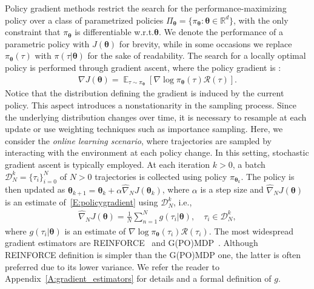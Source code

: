 \documentclass{article}
\makeatletter
\theoremstyle{remark}
\theoremstyle{definition}
\DeclareRobustCommand{\ie}{i.e.,\@\xspace}
\DeclareRobustCommand{\wrt}{w.r.t.\@\xspace}
\newcommand{\realspace}{\mathbb R}      %
\DeclareMathOperator*{\EV}{\mathbb{E}}
\newcommand{\EVV}[2][\ppvect \in \ppspace]{\EV_{#1}\left[{#2}\right]}
\newcommand{\de}{\,\mathrm{d}}
\newcommand{\vtheta}{\boldsymbol{\theta}}
\newcommand{\Tspace}{\mathcal{T}}
\newcommand{\Reward}{\mathcal{R}}
\newcommand{\pol}{\pi_{\vtheta}}
\newcommand{\score}[2]{\nabla\log\pi_{#1}(#2)}
\newcommand{\gradJ}[1]{\nabla J(#1)}
\newcommand{\gradApp}[2]{\widehat{\nabla}_{#2}J(#1)}
\makeatother
\begin{document}
Policy gradient methods restrict the search for the performance-maximizing policy over a class of parametrized policies $\Pi_{\vtheta}=\{\pol: \vtheta \in \realspace^d\}$, with the only constraint that $\pol$ is differentiable \wrt $\vtheta$. We denote the performance of a parametric policy with $J(\vtheta)$ for brevity, while in some occasions we replace $\pol(\tau)$ with $\pi(\tau|\vtheta)$ for the sake of readability.
The search for a locally optimal policy is performed through gradient ascent, where the policy gradient
is \cite{sutton2000policy, Peters2008reinf}:
\begin{align} \label{E:policygradient}
        \gradJ{\vtheta} = \EVV[\tau \sim \pol]{\score{\vtheta}{\tau}\Reward(\tau)}.
\end{align}
Notice that the distribution defining the gradient is induced by the current policy. This aspect introduces a nonstationarity in the sampling process. Since the underlying distribution changes over time, it is necessary to resample at each update or use weighting techniques such as importance sampling.
Here, we consider the \emph{online learning scenario}, where trajectories are sampled by interacting with the environment at each policy change. 
In this setting, stochastic gradient ascent is typically employed.
At each iteration $k >0$, a batch $\mathcal{D}_N^k = \{\tau_i\}_{i=0}^N$ of $N>0$ trajectories is collected using policy $\pi_{\vtheta_k}$.
The policy is then updated as $\vtheta_{k+1}  = \vtheta_k + \alpha\gradApp{\vtheta_k}{N}$, where $\alpha$ is a step size and $\gradApp{\vtheta}{N}$ is an estimate of~\eqref{E:policygradient} using $\mathcal{D}_N^k$, \ie
\begin{align} \label{E:policygradient.estimate}
        \gradApp{\vtheta}{N} = \frac{1}{N}\sum_{n=1}^{N} g(\tau_i|\vtheta), \quad \tau_i \in \mathcal{D}_N^k,
\end{align}
where $g(\tau_i|\vtheta)$ is an estimate of $\score{\vtheta}{\tau_i}\Reward(\tau_i)$.
The most widespread gradient estimators are REINFORCE~\citep{williams1992simple} and G(PO)MDP~\citep{baxter2001infinite}.
Although REINFORCE definition is simpler than the G(PO)MDP one, the latter is often preferred due to its lower variance.
We refer the reader to Appendix~\ref{A:gradient_estimators} for details and a formal definition of $g$.
\end{document}
